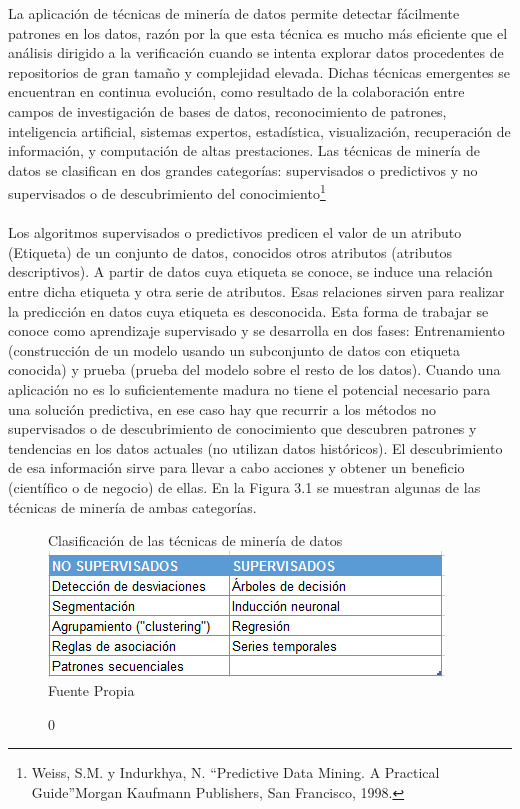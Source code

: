 \documentclass[a4paper,openright,12pt]{book}
\theoremstyle{definition}
\theoremstyle{remark}
\begin{document}
La aplicación de técnicas de minería de datos permite detectar fácilmente patrones en los datos, razón por la que esta técnica es mucho más eficiente que el análisis dirigido a la verificación cuando se intenta explorar datos procedentes de repositorios de gran tamaño y complejidad elevada. Dichas técnicas emergentes se encuentran en continua evolución, como resultado de la colaboración entre campos de investigación de bases de datos, reconocimiento de patrones, inteligencia artificial, sistemas expertos, estadística, visualización, recuperación de información, y computación de altas prestaciones. Las técnicas de minería de datos se clasifican en dos grandes categorías: supervisados o predictivos y no supervisados o de descubrimiento del conocimiento\footnote{Weiss, S.M. y Indurkhya, N. “Predictive Data Mining. A Practical Guide”Morgan Kaufmann Publishers, San Francisco, 1998.}\\\\
Los algoritmos supervisados o predictivos predicen el valor de un atributo (Etiqueta) de un conjunto de datos, conocidos otros atributos (atributos descriptivos). A partir de datos cuya etiqueta se conoce, se induce una relación entre dicha etiqueta y otra serie de atributos. Esas relaciones sirven para realizar la predicción en datos cuya etiqueta es desconocida. Esta forma de trabajar se conoce como aprendizaje supervisado y se desarrolla en dos fases: Entrenamiento (construcción de un modelo usando un subconjunto de datos con etiqueta conocida) y prueba (prueba del modelo sobre el resto de los datos). Cuando una aplicación no es lo suficientemente madura no tiene el potencial necesario para una solución predictiva, en ese caso hay que recurrir a los métodos no supervisados o de descubrimiento de  conocimiento que descubren patrones y tendencias en los datos actuales (no utilizan datos históricos). El descubrimiento de esa información sirve para llevar a cabo acciones y obtener un beneficio (científico o de negocio) de ellas. En la Figura 3.1 se muestran algunas de las técnicas de minería de ambas categorías.

\begin{figure}[h]
\centering
\caption0{Clasificación de las técnicas de minería de datos} 
\includegraphics[scale=0.8]{Tabla1}
\label{fig:Tabla1}
\\Fuente Propia
\end{figure}
\end{document}
